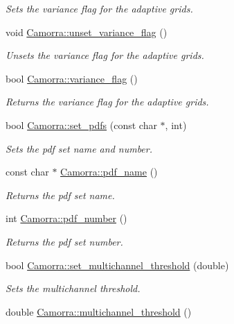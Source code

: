 \begin{DoxyCompactItemize}
\begin{DoxyCompactList}\small\item\em Sets the variance flag for the adaptive grids. \end{DoxyCompactList}\item 
\hypertarget{a00829_ab76fa4f9626c363ec0511160fdc28cdb}{
void \hyperlink{a00829_ab76fa4f9626c363ec0511160fdc28cdb}{Camorra::unset\_\-variance\_\-flag} ()}
\label{a00829_ab76fa4f9626c363ec0511160fdc28cdb}

\begin{DoxyCompactList}\small\item\em Unsets the variance flag for the adaptive grids. \end{DoxyCompactList}\item 
bool \hyperlink{a00829_a8b1617985c9fb6d46ada7afc4dbbcee4}{Camorra::variance\_\-flag} ()
\begin{DoxyCompactList}\small\item\em Returns the variance flag for the adaptive grids. \end{DoxyCompactList}\item 
bool \hyperlink{a00829_ac368b117d85d0b8799272b483b14c791}{Camorra::set\_\-pdfs} (const char $\ast$, int)
\begin{DoxyCompactList}\small\item\em Sets the pdf set name and number. \end{DoxyCompactList}\item 
\hypertarget{a00829_a2f7c6820df8813be79a94788715db133}{
const char $\ast$ \hyperlink{a00829_a2f7c6820df8813be79a94788715db133}{Camorra::pdf\_\-name} ()}
\label{a00829_a2f7c6820df8813be79a94788715db133}

\begin{DoxyCompactList}\small\item\em Returns the pdf set name. \end{DoxyCompactList}\item 
\hypertarget{a00829_a50db3e81e876becba1a5a0c20cef098e}{
int \hyperlink{a00829_a50db3e81e876becba1a5a0c20cef098e}{Camorra::pdf\_\-number} ()}
\label{a00829_a50db3e81e876becba1a5a0c20cef098e}

\begin{DoxyCompactList}\small\item\em Returns the pdf set number. \end{DoxyCompactList}\item 
bool \hyperlink{a00829_a3d412d1902455f35c2fbd020ed8651f5}{Camorra::set\_\-multichannel\_\-threshold} (double)
\begin{DoxyCompactList}\small\item\em Sets the multichannel threshold. \end{DoxyCompactList}\item 
\hypertarget{a00829_ac61ace3ceae1851c72e6e97d16cfdeb9}{
double \hyperlink{a00829_ac61ace3ceae1851c72e6e97d16cfdeb9}{Camorra::multichannel\_\-threshold} ()}
\label{a00829_ac61ace3ceae1851c72e6e97d16cfdeb9}


\end{DoxyCompactItemize}
